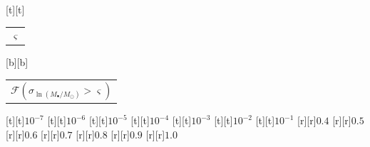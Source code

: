 %    
%
%
\begin{psfrags}%
\psfragscanon%
%
[t][t]{\color[rgb]{0,0,0}\setlength{\tabcolsep}{0pt}\begin{tabular}{c}{\Large$\varsigma$}\end{tabular}}%
[b][b]{\color[rgb]{0,0,0}\setlength{\tabcolsep}{0pt}\begin{tabular}{c}{\Large$\mathcal{F}(\sigma_{\ln (M_\bullet/M_\odot)} > \varsigma)$}\end{tabular}}%
%
[t][t]{$10^{-7}$}%
[t][t]{$10^{-6}$}%
[t][t]{$10^{-5}$}%
[t][t]{$10^{-4}$}%
[t][t]{$10^{-3}$}%
[t][t]{$10^{-2}$}%
[t][t]{$10^{-1}$}%
%
[r][r]{$0.4$}%
[r][r]{$0.5$}%
[r][r]{$0.6$}%
[r][r]{$0.7$}%
[r][r]{$0.8$}%
[r][r]{$0.9$}%
[r][r]{$1.0$}%
%
%
\end{psfrags}%
%
